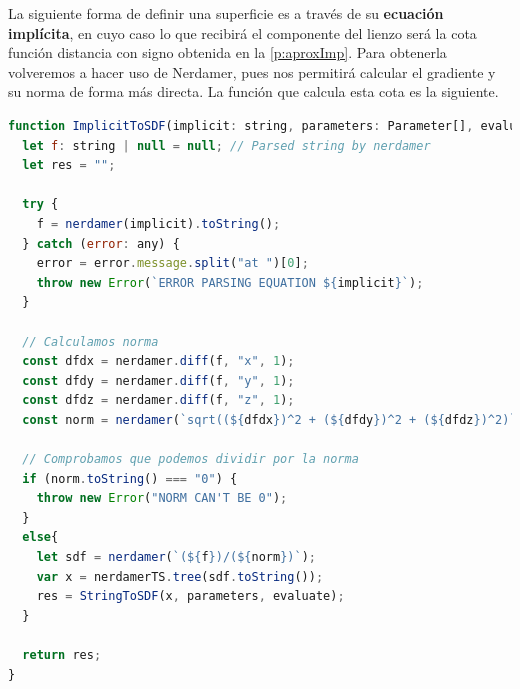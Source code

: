 La siguiente forma de definir una superficie es a través de su \textbf{ecuación implícita}, en cuyo caso lo que recibirá el componente del lienzo será la cota función distancia con signo obtenida en la \autoref{p:aproxImp}. Para obtenerla volveremos a hacer uso de Nerdamer, pues nos permitirá calcular el gradiente y su norma de forma más directa. La función que calcula esta cota es la siguiente.
\begin{lstlisting}[language=JavaScript, caption=Obtención de cota de ecuación implícita]
function ImplicitToSDF(implicit: string, parameters: Parameter[], evaluate: boolean = false) : string{
  let f: string | null = null; // Parsed string by nerdamer
  let res = "";

  try {
    f = nerdamer(implicit).toString();
  } catch (error: any) {
    error = error.message.split("at ")[0];
    throw new Error(`ERROR PARSING EQUATION ${implicit}`);
  }

  // Calculamos norma
  const dfdx = nerdamer.diff(f, "x", 1);
  const dfdy = nerdamer.diff(f, "y", 1);
  const dfdz = nerdamer.diff(f, "z", 1);
  const norm = nerdamer(`sqrt((${dfdx})^2 + (${dfdy})^2 + (${dfdz})^2)`);

  // Comprobamos que podemos dividir por la norma
  if (norm.toString() === "0") {
    throw new Error("NORM CAN'T BE 0");
  }
  else{
    let sdf = nerdamer(`(${f})/(${norm})`);
    var x = nerdamerTS.tree(sdf.toString());
    res = StringToSDF(x, parameters, evaluate);
  }

  return res;
}
\end{lstlisting}
